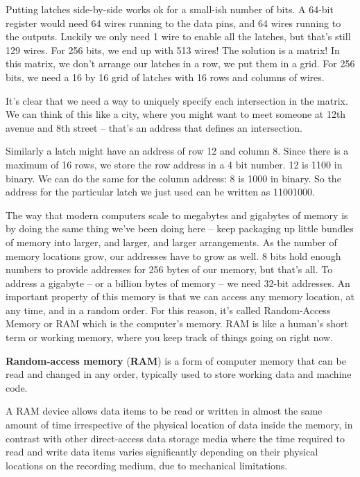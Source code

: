 
Putting latches side-by-side works ok for a small-ish number of bits. A 64-bit register would need 64 wires running
to the data pins, and 64 wires running to the outputs. Luckily we only need 1 wire to enable all the latches, but
that's still 129 wires. For 256 bits, we end up with 513 wires! The solution is a matrix! In this matrix, we don't
arrange our latches in a row, we put them in a grid. For 256 bits, we need a 16 by 16 grid of latches with 16 rows
and columns of wires.


It's clear that we need a way to uniquely specify each intersection in the matrix. We can think of this like a city,
where you might want to meet someone at 12th avenue and 8th street -- that's an address that defines an intersection.

\be
Similarly a latch might have an address of row 12 and column 8. Since there is a maximum of 16 rows, we store the row
address in a 4 bit number. 12 is 1100 in binary. We can do the same for the column address: 8 is 1000 in binary. So
the address for the particular latch we just used can be written as 11001000.
\ee

The way that modern computers scale to megabytes and gigabytes of memory is by doing the same thing we've been doing
here -- keep packaging up little bundles of memory into larger, and larger, and larger arrangements. As the number of
memory locations grow, our addresses have to grow as well. 8 bits hold enough numbers to provide addresses for 256
bytes of our memory, but that's all. To address a gigabyte – or a billion bytes of memory – we need 32-bit addresses.
An important property of this memory is that we can access any memory location, at any time, and in a random order.
For this reason, it's called Random-Access Memory or RAM which is the computer's memory. RAM is like a human's short
term or working memory, where you keep track of things going on right now.

\textbf{Random-access memory} (\textbf{RAM}) is a form of computer memory that can be read and changed in any order,
typically used to store working data and machine code.
\ed

A RAM device allows data items to be read or written in almost the same amount of time irrespective of the physical
location of data inside the memory, in contrast with other direct-access data storage media where the time required
to read and write data items varies significantly depending on their physical locations on the recording medium, due
to mechanical limitations.

